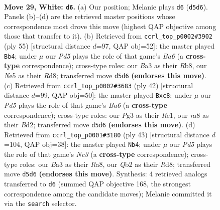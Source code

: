 \documentclass[11pt]{article}
\begin{document}
\clearpage

\begin{figure}[p]\centering
\begin{subfigure}{0.46\textwidth}\centering
\resizebox{\linewidth}{!}{%
\newchessgame
\chessboard[
  setfen={rnbqr1k1/5p2/1p3n2/3PN1pp/p1P1p3/B5PP/PQ2RP2/RB4K1 w - - 0 29},
  showmover=false,
  pgfstyle=straightmove, color=movearrow, markmove={d5-d6}
]}
\caption{}
\end{subfigure}\hfill
\begin{subfigure}{0.46\textwidth}\centering
\resizebox{\linewidth}{!}{%
\newchessgame
\chessboard[
  setfen={1r1rb1k1/4qp2/2p3pp/p4p2/P1B1n2P/bP2PN2/2Q1NPP1/R2R2K1 b - - 3 28},
  showmover=false,
  pgfstyle=straightmove, color=movearrow, markmove={a3-b4}
]}
\caption{}
\end{subfigure}
\\[4pt]
\begin{subfigure}{0.46\textwidth}\centering
\resizebox{\linewidth}{!}{%
\newchessgame
\chessboard[
  setfen={1rb1qr1k/6p1/Bbnp3p/4pp2/pP2P3/R1P2N1P/3BQPP1/4R1K1 w - - 0 22},
  showmover=false,
  pgfstyle=straightmove, color=movearrow, markmove={a6-c8}
]}
\caption{}
\end{subfigure}\hfill
\begin{subfigure}{0.46\textwidth}\centering
\resizebox{\linewidth}{!}{%
\newchessgame
\chessboard[
  setfen={r2r2k1/bbp1qpp1/p1n4p/P2P4/2P1p3/1N3N1P/R4PP1/2BQR1K1 b - - 0 22},
  showmover=false,
  pgfstyle=straightmove, color=movearrow, markmove={c6-b4}
]}
\caption{}
\end{subfigure}
\caption{\textbf{Move 29, White: \texttt{d6}.} (a) Our position; Melanie plays \texttt{d6} (\texttt{d5d6}). Panels (b)--(d) are the retrieved master positions whose correspondence most drove this move (highest QAP objective among those that transfer to it). (b) Retrieved from \texttt{ccrl\_top\_p0002\#3902} (ply 55) [structural distance $d$=97, QAP obj=52]: the master played \texttt{Bb4}; under $\mu$ our \emph{Pd5} plays the role of that game's \emph{Ba6} (a \textbf{cross-type} correspondence); cross-type roles: our \emph{B}a3 as their \emph{R}b8, our \emph{N}e5 as their \emph{R}d8; transferred move \texttt{d5d6} \textbf{(endorses this move)}. (c) Retrieved from \texttt{ccrl\_top\_p0002\#3683} (ply 42) [structural distance $d$=99, QAP obj=50]: the master played \texttt{Bxc8}; under $\mu$ our \emph{Pd5} plays the role of that game's \emph{Ba6} (a \textbf{cross-type} correspondence); cross-type roles: our \emph{P}g3 as their \emph{R}e1, our \emph{r}a8 as their \emph{B}d2; transferred move \texttt{d5d6} \textbf{(endorses this move)}. (d) Retrieved from \texttt{ccrl\_top\_p0001\#3180} (ply 43) [structural distance $d$=104, QAP obj=38]: the master played \texttt{Nb4}; under $\mu$ our \emph{Pd5} plays the role of that game's \emph{Nc3} (a \textbf{cross-type} correspondence); cross-type roles: our \emph{B}a3 as their \emph{R}a8, our \emph{Q}b2 as their \emph{R}d8; transferred move \texttt{d5d6} \textbf{(endorses this move)}. Synthesis: 4 retrieved analogs transferred to \texttt{d6} (summed QAP objective 168, the strongest correspondence among the candidate moves); Melanie committed it via the \texttt{search} selector.}
\label{fig:thought-m56}
\end{figure}
\end{document}
